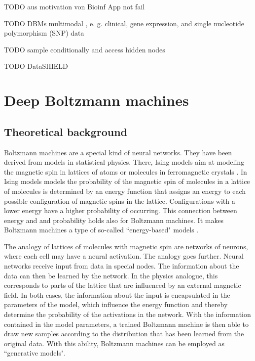 \documentclass[12pt]{article}
\begin{document}

TODO aus motivation von Bioinf App not fail

TODO DBMs multimodal , e. g. clinical, gene expression, and single nucleotide polymorphism (SNP) data

TODO sample conditionally and access hidden nodes

TODO DataSHIELD \citep{gaye_datashield,budin-ljosne_datashield}

\clearpage
\section{Deep Boltzmann machines}
\subsection{Theoretical background}\label{bmtheory}

Boltzmann machines \citep{ackley_boltzmann_1985} are a special kind of neural networks.
They have been derived from models in statistical physics.
There, Ising models aim at modeling the magnetic spin in lattices of atoms or molecules in ferromagnetic crystals \citep{isingmodel}.
In Ising models models the probability of the magnetic spin of molecules in a lattice of molecules is determined by an energy function that assigns an energy to each possible configuration of magnetic spins in the lattice.
Configurations with a lower energy have a higher probability of occurring.
This connection between energy and and probability holds also for Boltzmann machines.
It makes Boltzmann machines a type of so-called ``energy-based" models \citep{ranzato_ebm}.

The analogy of lattices of molecules with magnetic spin are networks of neurons, where each cell may have a neural activation.
The analogy goes further.
Neural networks receive input from data in special nodes.
The information about the data can then be learned by the network.
In the physics analogue, this corresponds to parts of the lattice that are influenced by an external magnetic field.
In both cases, the information about the input is encapsulated in the parameters of the model, which influence the energy function and thereby determine the probability of the activations in the network.
With the information contained in the model parameters, a trained Boltzmann machine is then able to draw new samples according to the distribution that has been learned from the original data.
With this ability, Boltzmann machines can be employed as ``generative models".
\end{document}
